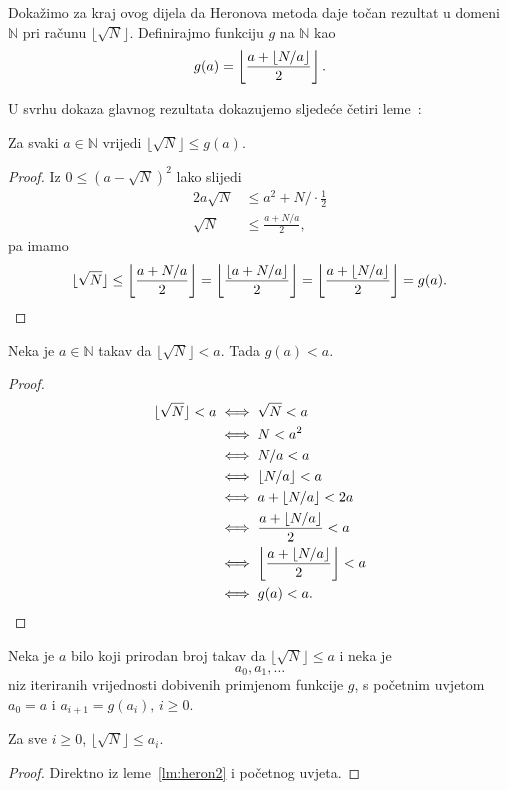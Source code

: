 \documentclass[12pt]{scrartcl}
\begin{document}
Dokažimo za kraj ovog dijela da Heronova metoda daje točan rezultat u domeni $\mathbb N$ pri računu $\lfloor\sqrt{N}\rfloor$.
 Definirajmo funkciju $g$ na $\mathbb N$ kao
\begin{equation}
    g(a) = \left\lfloor\frac{a+\lfloor N/a\rfloor}{2}\right\rfloor\text.
\end{equation}

U svrhu dokaza glavnog rezultata dokazujemo sljedeće četiri leme~\cite{mdickpaper}:
\begin{lema}\label{lm:heron1}
    Za svaki $a\in\mathbb N$ vrijedi $\lfloor\sqrt{N}\rfloor \leq g(a)$.
\end{lema}
\begin{proof}
    Iz $0\leq(a-\sqrt{N})^2$ lako slijedi
    \begin{align*}
        2a\sqrt{N} &\leq a^2 + N\Bigr/\cdot\frac12 \\
        \sqrt{N}&\leq\frac{a+N/a}{2},
    \end{align*}
pa imamo 
\begin{equation*}
    \lfloor\sqrt{N}\rfloor\leq\left\lfloor\frac{a+N/a}{2}\right\rfloor=\left\lfloor\frac{\lfloor a+N/a\rfloor}{2}\right\rfloor
    =\left\lfloor\frac{a+\lfloor N/a\rfloor}{2}\right\rfloor=g(a)\text.
\end{equation*}
\end{proof}

\begin{lema}\label{lm:heron2}
    Neka je $a\in\mathbb N$ takav da $\lfloor\sqrt{N}\rfloor<a$. Tada $g(a)<a$.
\end{lema}
\begin{proof}
    \begin{align*}
        \lfloor\sqrt{N}\rfloor<a &\iff \sqrt{N}<a\\
        &\iff N<a^2\\
        &\iff N/a<a\\
        &\iff \lfloor N/a\rfloor < a\\
        &\iff a+\lfloor N/a\rfloor < 2a\\
        &\iff \frac{a+\lfloor N/a\rfloor}{2}<a\\
        &\iff \left\lfloor\frac{a+\lfloor N/a\rfloor}{2}\right\rfloor < a\\
        &\iff g(a) < a\text.
    \end{align*}
\end{proof}

Neka je $a$ bilo koji prirodan broj takav da $\lfloor\sqrt{N}\rfloor\leq a$ i neka je
\begin{equation*}
    a_0,a_1,\dotsc
\end{equation*}
niz iteriranih vrijednosti dobivenih primjenom funkcije $g$, s početnim uvjetom $a_0=a$ i $a_{i+1}=g(a_i),\,i\geq 0$.
\begin{lema}\label{lm:heron3}
    Za sve $i\geq 0$, $\lfloor\sqrt{N}\rfloor\leq a_i$.
\end{lema}
\begin{proof}
    Direktno iz leme~\ref{lm:heron2} i početnog uvjeta.
\end{proof}
\end{document}
